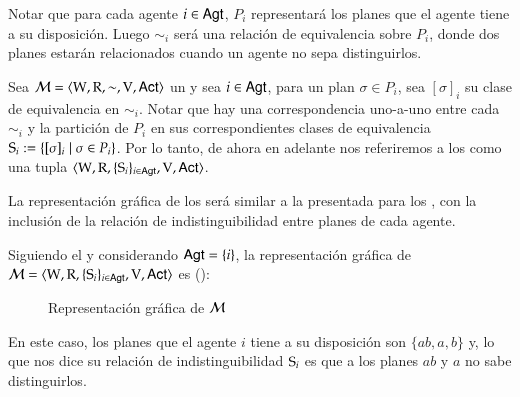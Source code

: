 Notar que para cada agente $i \in \AGT$, $P_i$ representará los planes que el agente tiene a su disposición. 
Luego $\sim_i$ será una relación de equivalencia sobre $P_i$, donde dos planes estarán relacionados cuando un agente no sepa distinguirlos.

Sea $\model = \tup{\W,\R,\sim,\V,\ACT}$ un \ults y sea $i \in \AGT$, para un plan $\sigma \in P_i$, sea $[\sigma]_i$ su clase de 
equivalencia en $\sim_i$. Notar que hay una correspondencia uno-a-uno entre cada $\sim_i$ y la partición de $P_i$ en sus correspondientes 
clases de equivalencia $\S_i := \{[\sigma]_i \mid \sigma \in P_i\}$. Por lo tanto, de ahora en adelante nos referiremos a los \ults como
una tupla $\tup{\W,\R,\{\S_i\}_{i \in \AGT},\V,\ACT}$.

La representación gráfica de los \ultss será similar a la presentada para los \ltss, con la inclusión de la relación de indistinguibilidad 
entre planes de cada agente.

\begin{ejemplo}\label{ejemplo:ults}
    Siguiendo el  y considerando $\AGT = \{i\}$, la representación gráfica 
    de $\model=\tup{\W,\R,\{\S_i\}_{i\in\AGT},\V,\ACT}$ es ():
    \begin{figure}[h]
        \centering
            \hspace{1cm}
            \caption{Representación gráfica de $\modults$}
            \label{fig:ults}
    \end{figure}

    En este caso, los planes que el agente $i$ tiene a su disposición son $\{ab,a,b\}$ y, lo que nos dice su relación de 
    indistinguibilidad $\S_i$ es que a los planes $ab$ y $a$ no sabe distinguirlos.
\end{ejemplo}

